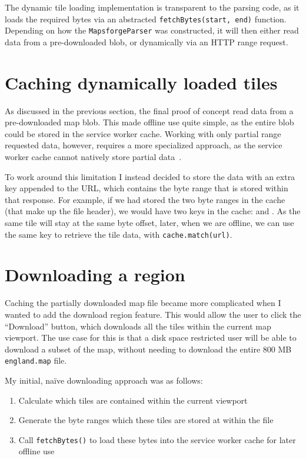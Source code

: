 \documentclass[hyphens]{final_report}
\begin{document}
The dynamic tile loading implementation is transparent to the parsing code, as it loads the required bytes via an abstracted \texttt{fetchBytes(start, end)} function. Depending on how the \texttt{MapsforgeParser} was constructed, it will then either read data from a pre-downloaded blob, or dynamically via an HTTP range request. 

\section{Caching dynamically loaded tiles}

As discussed in the previous section, the final proof of concept read data from a pre-downloaded map blob. This made offline use quite simple, as the entire blob could be stored in the service worker cache. Working with only partial range requested data, however, requires a more specialized approach, as the service worker cache cannot natively store partial data~\cite[see Section 5.4.5: \texttt{Cache.put(request, response)}]{w3c-service-workers-caches}.

To work around this limitation I instead decided to store the data with an extra key appended to the URL, which contains the byte range that is stored within that response. For example, if we had stored the two byte ranges in the cache (that make up the file header), we would have two keys in the cache:  and . As the same tile will stay at the same byte offset, later, when we are offline, we can use the same key to retrieve the tile data, with \texttt{cache.match(url)}.

\section{Downloading a region}

Caching the partially downloaded map file became more complicated when I wanted to add the download region feature. This would allow the user to click the ``Download'' button, which downloads all the tiles within the current map viewport. The use case for this is that a disk space restricted user will be able to download a subset of the map, without needing to download the entire 800 MB \texttt{england.map} file.

My initial, naïve downloading approach was as follows:

\begin{enumerate}
    \item Calculate which tiles are contained within the current viewport
    \item Generate the byte ranges which these tiles are stored at within the file
    \item Call \texttt{fetchBytes()} to load these bytes into the service worker cache for later offline use
\end{enumerate}
\end{document}
